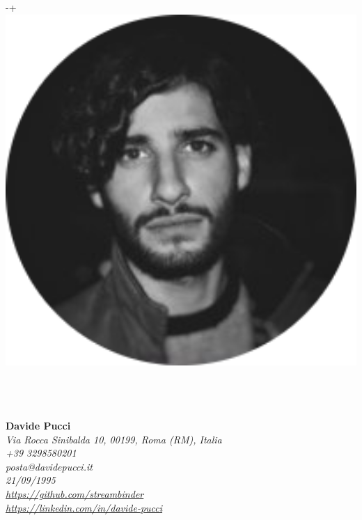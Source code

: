 \documentclass{article}
\begin{document}

\begin{minipage}[t]{.25\textwidth}
	\raisebox
	{\dimexpr-\height+\ht\strutbox\relax}
	{\includegraphics[width=1\textwidth]{profile.png}} \hfill \\\\\\\\
\end{minipage}
\begin{minipage}[t]{.7\textwidth}
	\begin{flushright}
		\vfill \textbf{\huge{Davide Pucci}} \\ \hfill \vfill
		\textit{
			Via Rocca Sinibalda 10, 00199, Roma (RM), Italia \hspace{1mm} \color{lightergray}\faHome\color{black} \\
			+39 3298580201                                   \hspace{1mm} \color{lightergray}\faPhone\color{black} \\
			posta@davidepucci.it                             \hspace{1mm} \color{lightergray}\faEnvelope\color{black} \\
			21/09/1995                                       \hspace{1mm} \color{lightergray}\faCalendar\color{black} \\
			\url{https://github.com/streambinder}            \hspace{1mm} \color{lightergray}\faGithubSquare\color{black} \\
			\url{https://linkedin.com/in/davide-pucci}       \hspace{1mm} \color{lightergray}\faLinkedinSquare\color{black} \\
		}
	\end{flushright}
\end{minipage}
\end{document}

